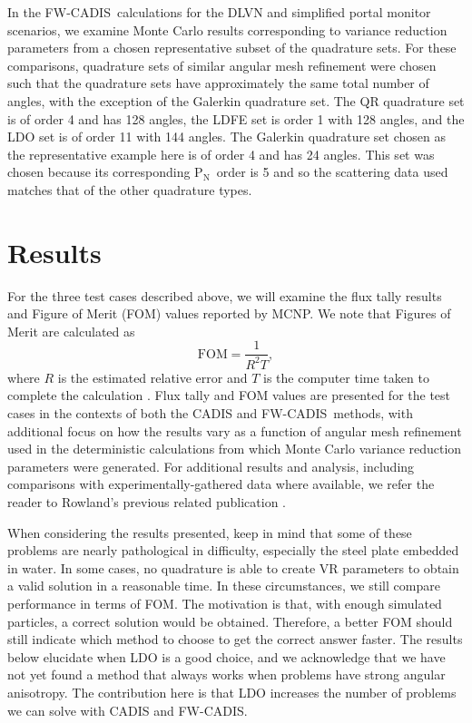 \documentclass{article} %
\newcommand{\pn}{P$_\mathrm{N}$}
\newcommand{\fwc}{\mbox{FW-CADIS}}
\begin{document}
In the \fwc\ calculations for the DLVN and simplified portal monitor
scenarios, we examine Monte Carlo results corresponding to variance reduction
parameters from a chosen representative subset of the quadrature sets. For
these comparisons, quadrature sets of similar angular mesh refinement were
chosen such that the quadrature sets have approximately the same total number
of angles, with the exception of the Galerkin quadrature set. The QR
quadrature set is of order 4 and has 128 angles, the LDFE set is order 1 with
128 angles, and the LDO set is of order 11 with 144 angles. The Galerkin
quadrature set chosen as the representative example here is of order 4 and has
24 angles. This set was chosen because its corresponding \pn\ order is 5 and
so the scattering data used matches that of the other quadrature types.

\section{Results}
\label{sec:results}

For the three test cases described above, we will examine the flux
tally results and Figure of Merit (FOM) values reported by MCNP. We note that
Figures of Merit are calculated as
%
\begin{equation}
\text{FOM} = \frac{1}{R^2T},
\label{eq:fom}
\end{equation}
%
where $R$ is the estimated relative error and $T$ is the computer time taken
to complete the calculation \cite{mcnp}. Flux tally and FOM values are
presented for the test cases in the contexts of both the CADIS and
\fwc\ methods, with additional focus on how the results vary as a function of
angular mesh refinement used in the deterministic calculations from which
Monte Carlo variance reduction parameters were generated. For additional
results and analysis, including comparisons with experimentally-gathered
data where available, we refer the reader to Rowland's previous related publication
\cite{kr}.

When considering the results presented, keep in mind that some of these problems are nearly pathological in difficulty, especially the steel plate embedded in water. In some cases, no quadrature is able to create VR parameters to obtain a valid solution in a reasonable time. In these circumstances, we still compare performance in terms of FOM. The motivation is that, with enough simulated particles, a correct solution would be obtained. Therefore, a better FOM should still indicate which method to choose to get the correct answer faster. The results below elucidate when LDO is a good choice, and we acknowledge that we have not yet found a method that always works when problems have strong angular anisotropy.  The contribution here is that LDO increases the number of problems we can solve with CADIS and \fwc.
\end{document}
